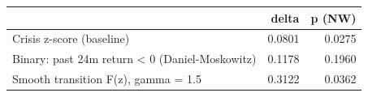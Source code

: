 \begin{tabular}{lrr}
\toprule
 & delta & p (NW) \\
\midrule
Crisis z-score (baseline) & 0.0801 & 0.0275 \\
Binary: past 24m return < 0 (Daniel-Moskowitz) & 0.1178 & 0.1960 \\
Smooth transition F(z), gamma = 1.5 & 0.3122 & 0.0362 \\
\bottomrule
\end{tabular}
